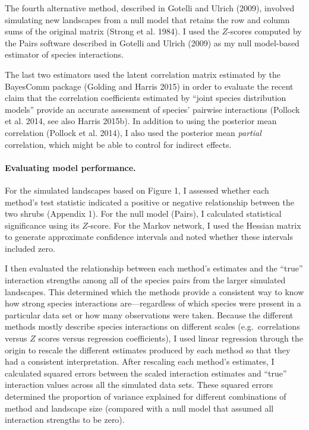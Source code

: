 \documentclass[12pt,]{article}
\begin{document}
\begin{spacing}{1.9}
\begin{flushleft}
The fourth alternative method, described in Gotelli and Ulrich (2009),
involved simulating new landscapes from a null model that retains the
row and column sums of the original matrix (Strong et al. 1984). I used
the \(Z\)-scores computed by the Pairs software described in Gotelli and
Ulrich (2009) as my null model-based estimator of species interactions.

The last two estimators used the latent correlation matrix estimated by
the BayesComm package (Golding and Harris 2015) in order to evaluate the
recent claim that the correlation coefficients estimated by ``joint
species distribution models'' provide an accurate assessment of species'
pairwise interactions (Pollock et al. 2014, see also Harris 2015b). In
addition to using the posterior mean correlation (Pollock et al. 2014),
I also used the posterior mean \emph{partial} correlation, which might
be able to control for indirect effects.

\paragraph{Evaluating model
performance.}\label{evaluating-model-performance.}

For the simulated landscapes based on Figure 1, I assessed whether each
method's test statistic indicated a positive or negative relationship
between the two shrubs (Appendix 1). For the null model (Pairs), I
calculated statistical significance using its \(Z\)-score. For the
Markov network, I used the Hessian matrix to generate approximate
confidence intervals and noted whether these intervals included zero.

I then evaluated the relationship between each method's estimates and
the ``true'' interaction strengths among all of the species pairs from
the larger simulated landscapes. This determined which the methods
provide a consistent way to know how strong species interactions
are---regardless of which species were present in a particular data set
or how many observations were taken. Because the different methods
mostly describe species interactions on different scales
(e.g.~correlations versus \(Z\) scores versus regression coefficients),
I used linear regression through the origin to rescale the different
estimates produced by each method so that they had a consistent
interpretation. After rescaling each method's estimates, I calculated
squared errors between the scaled interaction estimates and ``true''
interaction values across all the simulated data sets. These squared
errors determined the proportion of variance explained for different
combinations of method and landscape size (compared with a null model
that assumed all interaction strengths to be zero).


\end{flushleft}
\end{spacing}
\end{document}
